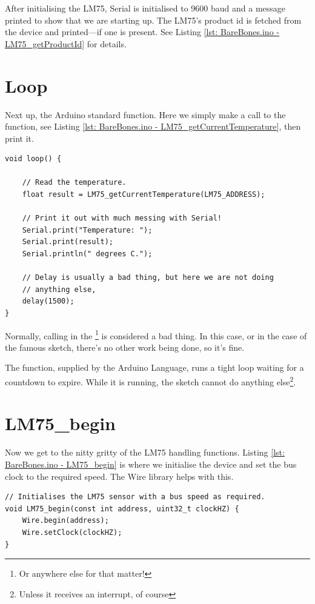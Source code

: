 After initialising the LM75, Serial is initialised to 9600 baud and a message printed to show that we are starting up. The LM75's product id is fetched from the device and printed---if one is present. See Listing \ref{lst: BareBones.ino - LM75_getProductId} for details.


\section{Loop}

Next up, the Arduino standard  function. Here we simply make a call to the \func{} function, see Listing \ref{lst: BareBones.ino - LM75_getCurrentTemperature}, then print it.


\begin{lstlisting}[caption={BareBones.ino - Loop.},label={lst: BareBones.ino - Loop}, style=myArduino, firstnumber=66]
void loop() {

    // Read the temperature.
    float result = LM75_getCurrentTemperature(LM75_ADDRESS);

    // Print it out with much messing with Serial!
    Serial.print("Temperature: ");
    Serial.print(result);
    Serial.println(" degrees C.");

    // Delay is usually a bad thing, but here we are not doing
    // anything else,
    delay(1500);
}
\end{lstlisting}

Normally, calling  in the \footnote{Or anywhere else for that matter!} is considered a bad thing. In this case, or in the case of the famous  sketch, there's no other work being done, so it's fine.

The  function, supplied by the Arduino Language, runs a tight loop waiting for a countdown to expire. While it is running, the sketch cannot do anything else\footnote{Unless it receives an interrupt, of course}.

\section{LM75\_begin}

Now we get to the nitty gritty of the LM75 handling functions. Listing \ref{lst: BareBones.ino - LM75_begin} is where we initialise the device and set the \twi{} bus clock to the required speed. The Wire library helps with this.


\begin{lstlisting}[caption={BareBones.ino - LM75\_begin.},label={lst: BareBones.ino - LM75_begin}, style=myArduino, firstnumber=82]
// Initialises the LM75 sensor with a bus speed as required.
void LM75_begin(const int address, uint32_t clockHZ) {
    Wire.begin(address);
    Wire.setClock(clockHZ);
}
\end{lstlisting}

